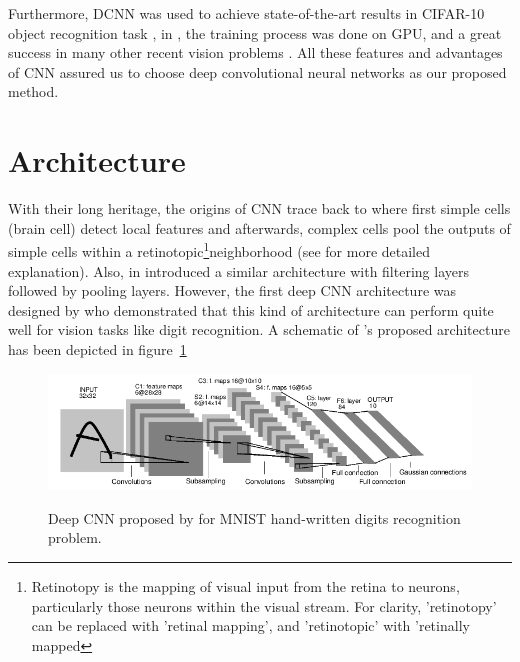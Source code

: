 
Furthermore, DCNN was used to achieve state-of-the-art results in CIFAR-10 object recognition task \cite{cirecsan2012multi}, in \cite{russakovsky2015imagenet}, the training process was done on GPU, and a great success in many other recent vision problems \cite{ciresan2015multi}. All these features and advantages of CNN assured us to choose deep convolutional neural networks as our proposed method.

\section{Architecture}

With their long heritage, the origins of CNN trace back to \cite{hubel1962receptive} where first simple cells (brain cell) detect local features and afterwards, complex cells pool the outputs of simple cells within a retinotopic\footnote{Retinotopy is the mapping of visual input from the retina to neurons, particularly those neurons within the visual stream. For clarity, 'retinotopy' can be replaced with 'retinal mapping', and 'retinotopic' with 'retinally mapped}neighborhood (see \cite{hubel1962receptive} for more detailed explanation). Also, \citeauthor*{fukushima1975cognitron} in \cite{fukushima1975cognitron, fukushima1980neocognitron} introduced a similar architecture with filtering layers followed by pooling layers. However, the first deep CNN architecture was designed by \citet{lecun1989backpropagation} who demonstrated that this kind of architecture can perform quite well for vision tasks like digit recognition. A schematic of \citeauthor{lecun1989backpropagation}'s proposed architecture has been depicted in figure~\ref{fig:lecun}

\begin{figure}[H]
	\centering
	{\includegraphics[width=1\textwidth]{images/lenetarch}}
	\caption{Deep CNN proposed by \citet{lecun1989backpropagation} for MNIST hand-written digits recognition problem.}
	\label{fig:lecun}
\end{figure}

